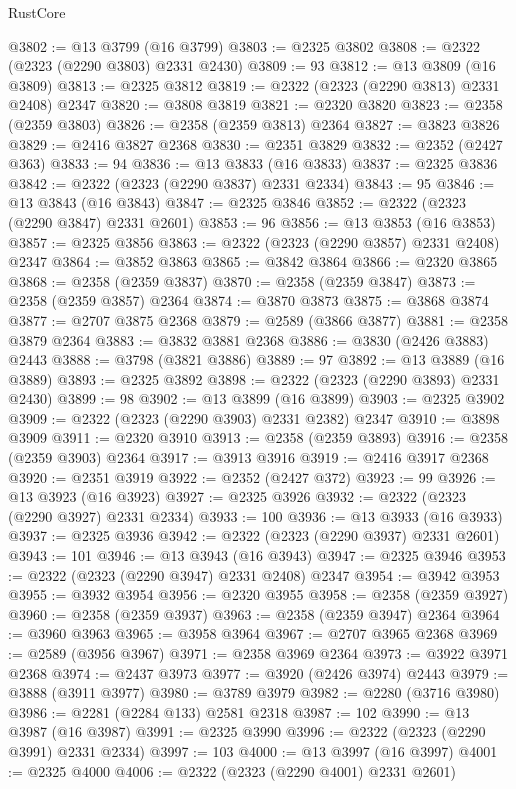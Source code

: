 \begin{lexlean}{RustCore}
\begin{coremodule}
@3802 := @13 @3799 (@16 @3799)
@3803 := @2325 @3802
@3808 := @2322 (@2323 (@2290 @3803) @2331 @2430)
@3809 := 93
@3812 := @13 @3809 (@16 @3809)
@3813 := @2325 @3812
@3819 := @2322 (@2323 (@2290 @3813) @2331 @2408) @2347
@3820 := @3808 @3819
@3821 := @2320 @3820
@3823 := @2358 (@2359 @3803)
@3826 := @2358 (@2359 @3813) @2364
@3827 := @3823 @3826
@3829 := @2416 @3827 @2368
@3830 := @2351 @3829
@3832 := @2352 (@2427 @363)
@3833 := 94
@3836 := @13 @3833 (@16 @3833)
@3837 := @2325 @3836
@3842 := @2322 (@2323 (@2290 @3837) @2331 @2334)
@3843 := 95
@3846 := @13 @3843 (@16 @3843)
@3847 := @2325 @3846
@3852 := @2322 (@2323 (@2290 @3847) @2331 @2601)
@3853 := 96
@3856 := @13 @3853 (@16 @3853)
@3857 := @2325 @3856
@3863 := @2322 (@2323 (@2290 @3857) @2331 @2408) @2347
@3864 := @3852 @3863
@3865 := @3842 @3864
@3866 := @2320 @3865
@3868 := @2358 (@2359 @3837)
@3870 := @2358 (@2359 @3847)
@3873 := @2358 (@2359 @3857) @2364
@3874 := @3870 @3873
@3875 := @3868 @3874
@3877 := @2707 @3875 @2368
@3879 := @2589 (@3866 @3877)
@3881 := @2358 @3879 @2364
@3883 := @3832 @3881 @2368
@3886 := @3830 (@2426 @3883) @2443
@3888 := @3798 (@3821 @3886)
@3889 := 97
@3892 := @13 @3889 (@16 @3889)
@3893 := @2325 @3892
@3898 := @2322 (@2323 (@2290 @3893) @2331 @2430)
@3899 := 98
@3902 := @13 @3899 (@16 @3899)
@3903 := @2325 @3902
@3909 := @2322 (@2323 (@2290 @3903) @2331 @2382) @2347
@3910 := @3898 @3909
@3911 := @2320 @3910
@3913 := @2358 (@2359 @3893)
@3916 := @2358 (@2359 @3903) @2364
@3917 := @3913 @3916
@3919 := @2416 @3917 @2368
@3920 := @2351 @3919
@3922 := @2352 (@2427 @372)
@3923 := 99
@3926 := @13 @3923 (@16 @3923)
@3927 := @2325 @3926
@3932 := @2322 (@2323 (@2290 @3927) @2331 @2334)
@3933 := 100
@3936 := @13 @3933 (@16 @3933)
@3937 := @2325 @3936
@3942 := @2322 (@2323 (@2290 @3937) @2331 @2601)
@3943 := 101
@3946 := @13 @3943 (@16 @3943)
@3947 := @2325 @3946
@3953 := @2322 (@2323 (@2290 @3947) @2331 @2408) @2347
@3954 := @3942 @3953
@3955 := @3932 @3954
@3956 := @2320 @3955
@3958 := @2358 (@2359 @3927)
@3960 := @2358 (@2359 @3937)
@3963 := @2358 (@2359 @3947) @2364
@3964 := @3960 @3963
@3965 := @3958 @3964
@3967 := @2707 @3965 @2368
@3969 := @2589 (@3956 @3967)
@3971 := @2358 @3969 @2364
@3973 := @3922 @3971 @2368
@3974 := @2437 @3973
@3977 := @3920 (@2426 @3974) @2443
@3979 := @3888 (@3911 @3977)
@3980 := @3789 @3979
@3982 := @2280 (@3716 @3980)
@3986 := @2281 (@2284 @133) @2581 @2318
@3987 := 102
@3990 := @13 @3987 (@16 @3987)
@3991 := @2325 @3990
@3996 := @2322 (@2323 (@2290 @3991) @2331 @2334)
@3997 := 103
@4000 := @13 @3997 (@16 @3997)
@4001 := @2325 @4000
@4006 := @2322 (@2323 (@2290 @4001) @2331 @2601)

\end{coremodule}
\end{lexlean}
